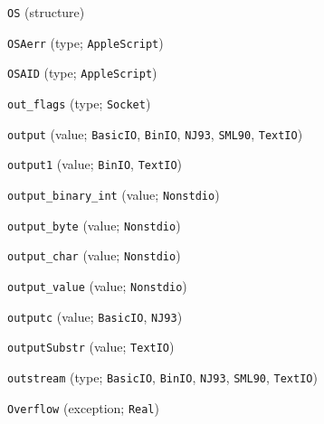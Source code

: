 \begin{description}
\item[] \verb"OS" (structure)
\item[] \verb"OSAerr" (type; \verb"AppleScript")
\item[] \verb"OSAID" (type; \verb"AppleScript")
\item[] \verb"out_flags" (type; \verb"Socket")
\item[] \verb"output" (value; \verb"BasicIO", \verb"BinIO", \verb"NJ93", \verb"SML90", \verb"TextIO")
\item[] \verb"output1" (value; \verb"BinIO", \verb"TextIO")
\item[] \verb"output_binary_int" (value; \verb"Nonstdio")
\item[] \verb"output_byte" (value; \verb"Nonstdio")
\item[] \verb"output_char" (value; \verb"Nonstdio")
\item[] \verb"output_value" (value; \verb"Nonstdio")
\item[] \verb"outputc" (value; \verb"BasicIO", \verb"NJ93")
\item[] \verb"outputSubstr" (value; \verb"TextIO")
\item[] \verb"outstream" (type; \verb"BasicIO", \verb"BinIO", \verb"NJ93", \verb"SML90", \verb"TextIO")
\item[] \verb"Overflow" (exception; \verb"Real")
\\[2ex]


\end{description}
